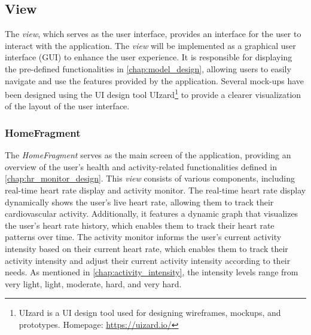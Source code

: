 \subsection{View}
The \emph{view}, which serves as the user interface, provides an interface for the user to interact with the application. The \emph{view} will be implemented as a graphical user interface (GUI) to enhance the user experience. 
It is responsible for displaying the pre-defined functionalities in \autoref{chap:model_design}, allowing users to easily navigate and use the features provided by the application. 
Several mock-ups have been designed using the UI design tool UIzard\footnote{UIzard is a UI design tool used for designing wireframes, mockups, and prototypes. Homepage: \url{https://uizard.io/}} to provide a clearer visualization of the layout of the user interface.

\subsubsection{HomeFragment}
The \emph{HomeFragment} serves as the main screen of the application, providing an overview of the user's health and activity-related functionalities defined in \autoref{chap:hr_monitor_design}. This \emph{view} consists of various components, including real-time heart rate display and activity monitor.
The real-time heart rate display dynamically shows the user's live heart rate, allowing them to track their cardiovascular activity. Additionally, it features a dynamic graph that visualizes the user's heart rate history, which enables them to track their heart rate patterns over time.
The activity monitor informs the user's current activity intensity based on their current heart rate, which enables them to track their activity intensity and adjust their current activity intensity according to their needs. As mentioned in \autoref{chap:activity_intensity}, the intensity levels range from very light, light, moderate, hard, and very hard.

